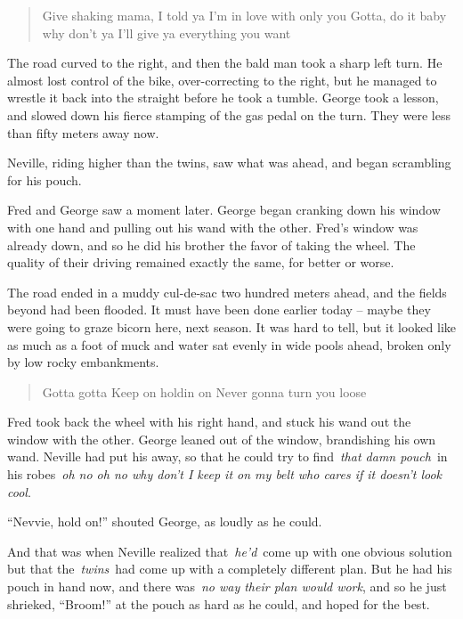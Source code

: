 \begin{quote}
\noindent {} Give shaking mama,\emph{\hfill\break
}I told ya I'm in love with only you\emph{\hfill\break
}Gotta, do it baby why don't ya\emph{\hfill\break
}I'll give ya everything you want \\
\end{quote}

The road curved to the right, and then the bald man took a sharp left
turn. He almost lost control of the bike, over-correcting to the right,
but he managed to wrestle it back into the straight before he took a
tumble. George took a lesson, and slowed down his fierce stamping of the
gas pedal on the turn. They were less than fifty meters away now.

Neville, riding higher than the twins, saw what was ahead, and began
scrambling for his pouch.

Fred and George saw a moment later. George began cranking down his
window with one hand and pulling out his wand with the other. Fred's
window was already down, and so he did his brother the favor of taking
the wheel. The quality of their driving remained exactly the same, for
better or worse.

The road ended in a muddy cul-de-sac two hundred meters ahead, and the
fields beyond had been flooded. It must have been done earlier today --
maybe they were going to graze bicorn here, next season. It was hard to
tell, but it looked like as much as a foot of muck and water sat evenly
in wide pools ahead, broken only by low rocky embankments.\\

\begin{quote}
\noindent {} Gotta gotta\emph{\hfill\break
}Keep on holdin on\emph{\hfill\break
}Never gonna turn you loose \\
\end{quote}

Fred took back the wheel with his right hand, and stuck his wand out the
window with the other. George leaned out of the window, brandishing his
own wand. Neville had put his away, so that he could try to
find~\emph{that damn pouch}~in his robes~\emph{oh no oh no why don't I
keep it on my belt who cares if it doesn't look cool}.

``Nevvie, hold on!'' shouted George, as loudly as he could.

And that was when Neville realized that~\emph{he'd}~come up with one
obvious solution but that the~\emph{twins}~had come up with a completely
different plan. But he had his pouch in hand now, and there was~\emph{no
way their plan would work}, and so he just shrieked, ``Broom!'' at the
pouch as hard as he could, and hoped for the best.

